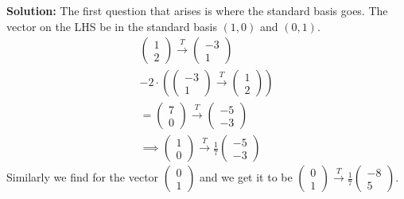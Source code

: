 \documentclass[a4paper,12pt,reqno,oneside]{amsart}
\theoremstyle{plain}
\numberwithin{equation}{section}
\begin{document}
\newline
\newline
\textbf{Solution: }
The first question that arises is where the standard basis goes. The vector on the LHS be in the standard basis $\left( 1,0 \right)$ and $\left( 0,1 \right)$.
$$
\begin{array}{cc}
     \begin{pmatrix}
         1 \\
         2
     \end{pmatrix}
     \xrightarrow{T}
     \begin{pmatrix}
         -3 \\
         1
     \end{pmatrix}
     \\
     -2 \cdot \left(
     \begin{pmatrix}
         -3 \\
         1
     \end{pmatrix}
     \xrightarrow{T}
     \begin{pmatrix}
         1 \\
         2
     \end{pmatrix}
     \right)
	 \\
     = \begin{pmatrix}
         7 \\
         0
     \end{pmatrix}
     \xrightarrow{T}
     \begin{pmatrix}
         -5 \\
         -3
     \end{pmatrix}
     \\
     \implies \begin{pmatrix}
         1 \\
         0
     \end{pmatrix}
     \xrightarrow{T}
     \frac{1}{7}
     \begin{pmatrix}
         -5 \\
         -3
     \end{pmatrix}
\end{array}
$$
Similarly we find for the vector $\begin{pmatrix}
    0 \\
    1
\end{pmatrix}$ and we get it to be $\begin{pmatrix}
    0 \\
    1
\end{pmatrix} \xrightarrow{T} \frac{1}{7}\begin{pmatrix}
    -8 \\
    5
\end{pmatrix}$.
\end{document}
